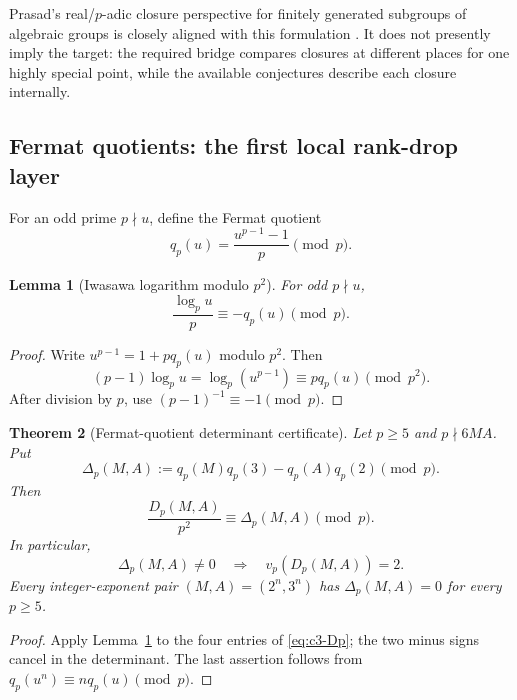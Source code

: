\documentclass[11pt,oneside]{article}
\newtheorem{theorem}{Theorem}[section]
\newtheorem{lemma}[theorem]{Lemma}
\theoremstyle{definition}
\theoremstyle{remark}
\begin{document}
Prasad's real/$p$-adic closure perspective for finitely generated subgroups of algebraic
groups is closely aligned with this formulation \cite{Prasad2025}.  It does not presently
imply the target: the required bridge compares closures at different places for one highly
special point, while the available conjectures describe each closure internally.

\subsection{Fermat quotients: the first local rank-drop layer}
\label{sec:c3-fermat}

For an odd prime $p\nmid u$, define the Fermat quotient
\begin{equation}\label{eq:c3-fermat-quotient}
 q_p(u)=\frac{u^{p-1}-1}{p}\pmod p.
\end{equation}

\begin{lemma}[Iwasawa logarithm modulo $p^2$]
\label{lem:c3-log-fermat}
For odd $p\nmid u$,
\begin{equation}\label{eq:c3-log-fermat}
 \frac{\log_pu}{p}\equiv-q_p(u)\pmod p.
\end{equation}
\end{lemma}

\begin{proof}
Write $u^{p-1}=1+pq_p(u)$ modulo $p^2$.  Then
\[
 (p-1)\log_pu=\log_p(u^{p-1})\equiv pq_p(u)\pmod{p^2}.
\]
After division by $p$, use $(p-1)^{-1}\equiv-1\pmod p$.
\end{proof}

\begin{theorem}[Fermat-quotient determinant certificate]
\label{thm:c3-fermat-determinant}
Let $p\ge5$ and $p\nmid6MA$.  Put
\begin{equation}\label{eq:c3-Delta-p}
 \Delta_p(M,A)
 :=q_p(M)q_p(3)-q_p(A)q_p(2)\pmod p.
\end{equation}
Then
\begin{equation}\label{eq:c3-Dp-modp}
 \frac{D_p(M,A)}{p^2}\equiv\Delta_p(M,A)\pmod p.
\end{equation}
In particular,
\[
 \Delta_p(M,A)\ne0
 \quad\Longrightarrow\quad
 v_p(D_p(M,A))=2.
\]
Every integer-exponent pair $(M,A)=(2^n,3^n)$ has
$\Delta_p(M,A)=0$ for every $p\ge5$.
\end{theorem}

\begin{proof}
Apply Lemma~\ref{lem:c3-log-fermat} to the four entries of
\eqref{eq:c3-Dp}; the two minus signs cancel in the determinant.  The last assertion follows
from
$q_p(u^n)\equiv n q_p(u)\pmod p$.
\end{proof}
\end{document}
